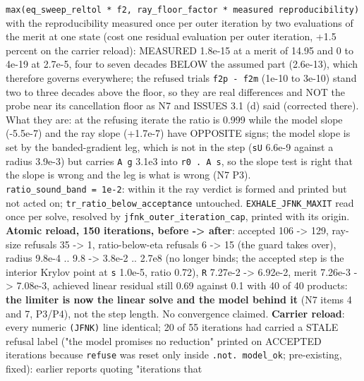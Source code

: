 \documentclass[english,a4paper]{my_memo}
\begin{document}
\begin{itemize}
  \texttt{max(eq\_sweep\_reltol\ *\ \textbar{}f2\textbar{},\ ray\_floor\_factor\ *\ measured\ reproducibility)}
  with the reproducibility measured once per outer iteration by two
  evaluations of the merit at one state (cost one residual evaluation per
  outer iteration, +1.5 percent on the carrier reload): MEASURED 1.8e-15 at
  a merit of 14.95 and 0 to 4e-19 at 2.7e-5, four to seven decades BELOW the
  assumed part (2.6e-13), which therefore governs everywhere; the refused
  trials\textquotesingle{} \texttt{\textbar{}f2p\ -\ f2m\textbar{}} (1e-10 to 3e-10) stand two to three decades above
  the floor, so they are real differences and NOT the probe near its
  cancellation floor as N7 and ISSUES 3.1 (d) said (corrected there). What
  they are: at the refusing iterate the ratio is 0.999 while the model slope
  (-5.5e-7) and the ray slope (+1.7e-7) have OPPOSITE signs; the model slope
  is set by the banded-gradient leg, which is not in the step (\texttt{\textbar{}\textbar{}sU\textbar{}\textbar{}}
  6.6e-9 against a radius 3.9e-3) but carries \texttt{\textbar{}\textbar{}A\ g\textbar{}\textbar{}} 3.1e3 into
  \texttt{r0\ .\ A\ s}, so the slope test is right that the slope is wrong and the
  leg is what is wrong (N7 P3). \texttt{ratio\_sound\_band\ =\ 1e-2}: within it the
  ray verdict is formed and printed but not acted on;
  \texttt{tr\_ratio\_below\_acceptance} untouched. \texttt{EXHALE\_JFNK\_MAXIT} read once per
  solve, resolved by \texttt{jfnk\_outer\_iteration\_cap}, printed with its origin.
  \textbf{Atomic reload, 150 iterations, before -\textgreater{} after}: accepted 106 -\textgreater{} 129,
  ray-size refusals 35 -\textgreater{} 1, ratio-below-eta refusals 6 -\textgreater{} 15 (the guard
  takes over), radius 9.8e-4 .. 9.8 -\textgreater{} 3.8e-2 .. 2.7e8 (no longer binds;
  the accepted step is the interior Krylov point at \texttt{\textbar{}\textbar{}s\textbar{}\textbar{}} 1.0e-5, ratio
  0.72), \texttt{\textbar{}\textbar{}R\textbar{}\textbar{}} 7.27e-2 -\textgreater{} 6.92e-2, merit 7.26e-3 -\textgreater{} 7.08e-3, achieved
  linear residual still 0.69 against 0.1 with 40 of 40 products: \textbf{the
  limiter is now the linear solve and the model behind it} (N7 items 4
  and 7, P3/P4), not the step length. No convergence claimed. \textbf{Carrier
  reload}: every numeric \texttt{(JFNK)} line identical; 20 of 55 iterations had
  carried a STALE refusal label ("the model promises no reduction" printed
  on ACCEPTED iterations because \texttt{refuse} was reset only inside \texttt{.not.\ model\_ok}; pre-existing, fixed): earlier reports quoting "iterations that

\end{itemize}
\end{document}

